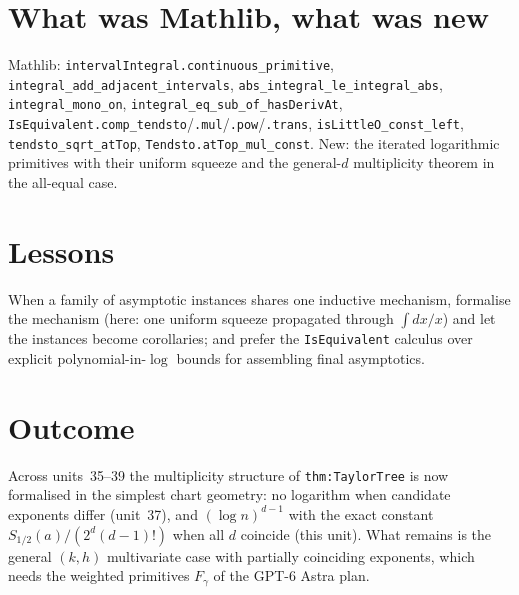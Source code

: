 \documentclass[11pt]{article}
\begin{document}
\section{What was Mathlib, what was new}
Mathlib: \texttt{intervalIntegral.continuous\_primitive}, \texttt{integral\_add\_adjacent\_intervals},
\texttt{abs\_integral\_le\_integral\_abs}, \texttt{integral\_mono\_on}, \texttt{integral\_eq\_sub\_of\_hasDerivAt},
\texttt{IsEquivalent.comp\_tendsto}/\texttt{.mul}/\texttt{.pow}/\texttt{.trans},
\texttt{isLittleO\_const\_left}, \texttt{tendsto\_sqrt\_atTop}, \texttt{Tendsto.atTop\_mul\_const}. New: the
iterated logarithmic primitives with their uniform squeeze and the general-$d$ multiplicity theorem in
the all-equal case.

\section{Lessons}
When a family of asymptotic instances shares one inductive mechanism, formalise the mechanism (here:
one uniform squeeze propagated through $\int dx/x$) and let the instances become corollaries; and prefer
the \texttt{IsEquivalent} calculus over explicit polynomial-in-$\log$ bounds for assembling final
asymptotics.

\section{Outcome}
Across units~35--39 the multiplicity structure of \texttt{thm:TaylorTree} is now formalised in the
simplest chart geometry: no logarithm when candidate exponents differ (unit~37), and
$(\log n)^{d-1}$ with the exact constant $S_{1/2}(a)/(2^d(d-1)!)$ when all $d$ coincide (this unit).
What remains is the general $(k,h)$ multivariate case with partially coinciding exponents, which needs
the weighted primitives $F_\gamma$ of the GPT-6 Astra plan.
\end{document}
